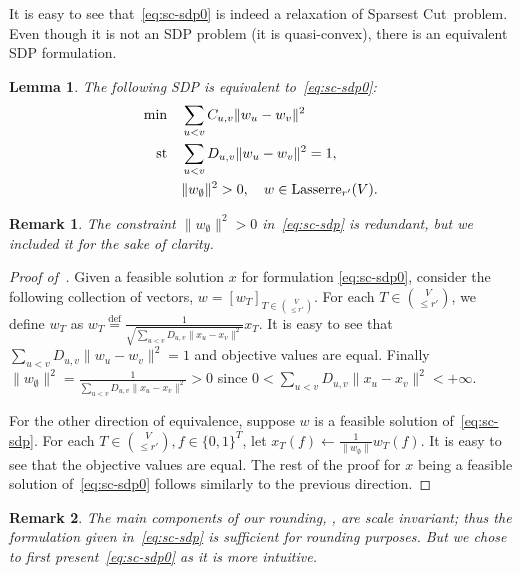 \documentclass{article}
\def\triangleq{\overset{\mathrm{def}}{=}}
\newtheorem{remark}{Remark}[section]
\newtheorem{lemma}{Lemma}[section]
\let\es=\emptyset
\newcommand{\lasserreii}[2]{\mathrm{Lasserre}_{#1}(#2)}
\newcommand{\xvec}{\vec{x}} \newcommand{\yvec}{\vec{y}} \newcommand{\xmat}{\vec{X}} \newcommand{\ymat}{\vec{Y}} \newcommand{\zmat}{\vec{Z}}
\newcommand{\nusc}{\textsc{\sf Non-Uniform Sparsest Cut}}
\newcounter{alg-count}
\def\ngap{}
\def\vec{}
\renewcommand{\nusc}{{\sc Sparsest Cut}}
\newcommand{\wvec}{\vec{w}}
\begin{document}
It is easy to see that~\cref{eq:sc-sdp0} is indeed a relaxation of
\nusc\ problem.  Even though it is not an SDP problem (it is
quasi-convex), there is an equivalent SDP formulation.
\begin{lemma} \label{lem:sdp-eq}
The following SDP is equivalent to~\cref{eq:sc-sdp0}:
\begin{align}
\label{eq:sc-sdp}
\min \quad&\sum_{u<v} C_{u,v} \| \wvec_u - \wvec_v \|^2 \\
\mathrm{st}\quad & \sum_{u<v} D_{u,v} \| \wvec_u - \wvec_v \|^2 = 1, \notag\\
&\| \wvec_{\es}\|^2 > 0,\quad \wvec \in \lasserreii{r'}{V}.\notag
\end{align} 
\end{lemma}
\begin{remark}
  The constraint $\|\wvec_{\es}\|^2 > 0$ in~\cref{eq:sc-sdp} is
  redundant, but we included it for the sake of clarity.
\end{remark}
\begin{proof} [Proof of~] Given a feasible solution
  $\xvec$ for formulation \eqref{eq:sc-sdp0}, consider the following
  collection of vectors, $\wvec=[\wvec_T]_{T\in \binom{V}{\le r'}}$.
  For each $T\in \binom{V}{\le r'}$, we define $\wvec_T$ as $\wvec_T
  \triangleq \frac{1}{\sqrt{\sum_{u<v} D_{u,v} \| \xvec_u - \xvec_v
      \|^2}} \xvec_T$.
It is easy to see that $\sum_{u<v} D_{u,v} \| \wvec_u - \wvec_v
  \|^2=1$ and objective values are equal.
Finally $\|\wvec_{\es}\|^2 = \frac{1} {\sum_{u<v} D_{u,v} \| \xvec_u
    - \xvec_v \|^2} > 0$ since $0<\sum_{u<v} D_{u,v} \| \xvec_u -
  \xvec_v \|^2 < +\infty$.

  For the other direction of equivalence, suppose $\wvec$ is a
  feasible solution of~\cref{eq:sc-sdp}. For each $T\in \binom{V}{\le
    r'}, f\in \{0,1\}^T$, let $\xvec_T(f) \gets
  \frac{1}{\|\wvec_{\es}\|} \wvec_T(f)$. It is easy to see that the
  objective values are equal. The rest of the proof for $\xvec$ being
  a feasible solution of~\cref{eq:sc-sdp0} follows similarly to the
  previous direction.
\end{proof}
\begin{remark}
  The main components of our rounding,
  , are scale invariant; thus the
  formulation given in~\cref{eq:sc-sdp} is sufficient for rounding
  purposes. But we chose to first present~\cref{eq:sc-sdp0} as it is
  more intuitive.
\end{remark}
\ngap
\end{document}
